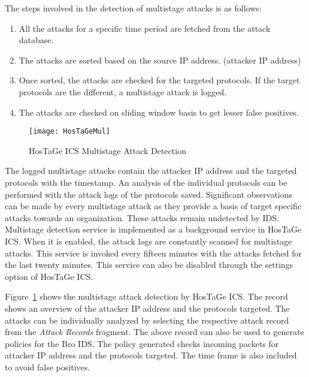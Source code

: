 \documentclass[article,msc=informatik,type=msc,colorback,accentcolor=tud9c]{tudthesis}
\begin{document}
	\vspace{3mm}
	 The steps involved in the detection of multistage attacks is as follows:
	\begin{enumerate}
	
	\item All the attacks for a specific time period are fetched from the attack database. 
	\item The attacks are sorted based on the source \ac{IP} address. (attacker \ac{IP} address)
	\item Once sorted, the attacks are checked for the targeted protocols. If the target protocols are the different, a multistage attack is logged.
	\item The attacks are checked on sliding window basis to get lesser false positives.
	
	\end{enumerate}
	
	\begin{figure}[H]
		\centering 
		\texttt{[image: HosTaGeMul]}
				\caption[HosTaGe ICS Multistage Attack Detection]{\label{f:HosTaGe ICS Multistage Attack Detection}HosTaGe ICS Multistage Attack Detection}
		\end{figure}
	
	The logged multistage attacks contain the attacker \ac{IP} address and the targeted protocols with the timestamp. An analysis of the individual protocols can be performed with the attack logs of the protocols saved.  Significant observations can be made by every multistage attack as they provide a basis of target specific attacks towards an organization. These attacks remain undetected by IDS. Multistage detection service is implemented as a background service in HosTaGe ICS. When it is enabled, the attack logs are constantly scanned for multistage attacks. This service is invoked every fifteen minutes with the attacks fetched for the last twenty minutes. This service can also be disabled through the settings option of HosTaGe ICS. 


	\vspace{3mm}
	Figure~\ref{f:HosTaGe ICS Multistage Attack Detection} shows the multistage attack detection by HosTaGe ICS. The record shows an overview of the attacker \ac{IP} address and the protocols targeted. The attacks can be individually analyzed by selecting the respective attack record from the \textit{Attack Records} fragment. The above record can also be used to generate policies for the Bro \ac{IDS}. The policy generated checks incoming packets for attacker \ac{IP} address and the protocols targeted. The time frame is also included to avoid false positives. 
	
\end{document}
